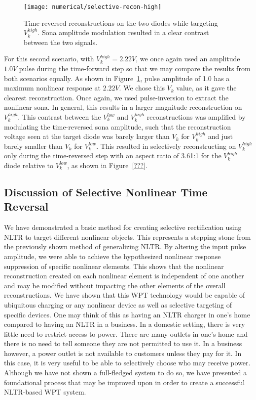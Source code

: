 \begin{figure}[t]
\centering
\texttt{[image: numerical/selective-recon-high]}
\caption[Selective reconstruction on a $V_{k}^{high}$ diode]{Time-reversed reconstructions on the two diodes while targeting $V_{k}^{high}$. Sona amplitude modulation resulted in a clear contrast between the two signals.}
\label{fig:numerical-selective-recon-high}
\end{figure}

For this second scenario, with $V_k^{high} = 2.22V$, we once again used an amplitude $1.0 V$ pulse during the time-forward step so that we may compare the results from both scenarios equally. As shown in Figure~\ref{fig:numerical-selective-recon-high}, pulse amplitude of 1.0 has a maximum nonlinear response at $2.22V$. We chose this $V_k$ value, as it gave the clearest reconstruction. Once again, we used pulse-inversion to extract the nonlinear sona. In general, this results in a larger magnitude reconstruction on $V_k^{high}$. This contrast between the $V_k^{low}$ and $V_k^{high}$ reconstructions was amplified by modulating the time-reversed sona amplitude, such that the reconstruction voltage seen at the target diode was barely larger than $V_k$ for $V_k^{high}$ and just barely smaller than $V_k$ for $V_k^{low}$. This resulted in selectively reconstructing on $V_k^{high}$ only during the time-reversed step with an aspect ratio of 3.61:1 for the $V_k^{high}$  diode relative to $V_k^{low}$, as shown in Figure~\ref{???}.

\subsection{Discussion of Selective Nonlinear Time Reversal}

We have demonstrated a basic method for creating selective rectification using NLTR to target different nonlinear objects. This represents a stepping stone from the previously shown method of generalizing NLTR. By altering the input pulse amplitude, we were able to achieve the hypothesized nonlinear response suppression of specific nonlinear elements. This shows that the nonlinear reconstruction created on each nonlinear element is independent of one another and may be modified without impacting the other elements of the overall reconstructions. We have shown that this WPT technology would be capable of ubiquitous charging or any nonlinear device as well as selective targeting of specific devices. One may think of this as having an NLTR charger in one's home compared to having an NLTR in a business. In a domestic setting, there is very little need to restrict access to power. There are many outlets in one's home and there is no need to tell someone they are not permitted to use it. In a business however, a power outlet is not available to customers unless they pay for it. In this case, it is very useful to be able to selectively choose who may receive power. Although we have not shown a full-fledged system to do so, we have presented a foundational process that may be improved upon in order to create a successful NLTR-based WPT system.

